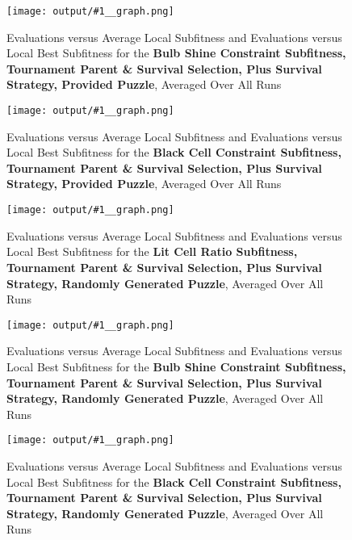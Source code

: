 \documentclass[11pt]{article}
\newcommand{\fitnessplotcaption}[1]{\caption{Evaluations versus Average Local Subfitness and Evaluations versus 
    Local Best Subfitness for the \textbf{{#1}}, Averaged Over All Runs}}
\newcommand{\addgraphic}[1]{\centerline{\texttt{[image: output/\#1\_\_graph.png]}}}
\begin{document}
\begin{figure}
    \addgraphic{website_puzzle/website_puzzle__tournament_parent__tournament_survival__plus__bulb_shine_constr}
    \fitnessplotcaption{Bulb Shine Constraint Subfitness, Tournament Parent \& Survival Selection,
    Plus Survival Strategy, Provided Puzzle}
    \label{fig:tourny_web2}
\end{figure}

\begin{figure}
    \addgraphic{website_puzzle/website_puzzle__tournament_parent__tournament_survival__plus__black_cell_constr}
    \fitnessplotcaption{Black Cell Constraint Subfitness, Tournament Parent \& Survival Selection,
    Plus Survival Strategy, Provided Puzzle}
    \label{fig:tourny_web3}
\end{figure}

\begin{figure}
    \addgraphic{random_gen/random_gen__tournament_parent__tournament_survival__plus__lit_cell_ratio}
    \fitnessplotcaption{Lit Cell Ratio Subfitness, Tournament Parent \& Survival Selection, Plus
    Survival Strategy, Randomly Generated Puzzle}
    \label{fig:tourny_rand1}
\end{figure}

\begin{figure}
    \addgraphic{random_gen/random_gen__tournament_parent__tournament_survival__plus__bulb_shine_constr}
    \fitnessplotcaption{Bulb Shine Constraint Subfitness, Tournament Parent \& Survival Selection,
    Plus Survival Strategy, Randomly Generated Puzzle}
    \label{fig:tourny_rand2}
\end{figure}

\begin{figure}
    \addgraphic{random_gen/random_gen__tournament_parent__tournament_survival__plus__black_cell_constr}
    \fitnessplotcaption{Black Cell Constraint Subfitness, Tournament Parent \& Survival Selection,
    Plus Survival Strategy, Randomly Generated Puzzle}
    \label{fig:tourny_rand3}
\end{figure}


\end{document}
